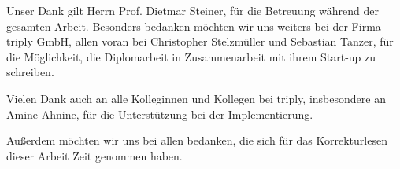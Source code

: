 
Unser Dank gilt Herrn Prof. Dietmar Steiner, für die Betreuung während der gesamten Arbeit.
Besonders bedanken möchten wir uns weiters bei der Firma triply GmbH, allen voran bei Christopher Stelzmüller
und Sebastian Tanzer, für die Möglichkeit, die Diplomarbeit in Zusammenarbeit mit ihrem Start-up zu schreiben.


Vielen Dank auch an alle Kolleginnen und Kollegen bei triply, insbesondere an Amine Ahnine, für die Unterstützung bei der Implementierung.


Außerdem möchten wir uns bei allen bedanken, die sich für das Korrekturlesen dieser Arbeit Zeit genommen haben.
